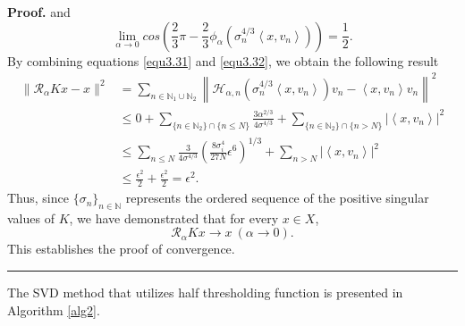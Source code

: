 \documentclass[a4paper,12pt]{article}
\numberwithin{equation}{section}
\newenvironment{proof}[1][Proof]{\textbf{#1.} }
{\ \rule{0.75em}{0.75em}\smallskip}
\begin{document}
\begin{proof}
    and
    \begin{equation*}
        \lim_{\alpha\rightarrow 0}cos\left(\frac{2}{3}\pi-\frac{2}{3}\phi_{\alpha}\left( \sigma_{n}^{4/3}\left<x,v_{n}\right>\right)\right)=\frac{1}{2}.
    \end{equation*}
    By combining equations \eqref{equ3.31} and \eqref{equ3.32}, we obtain the following result
    \begin{align*}
        \|\mathcal{R}_{\alpha}Kx-x\|^2
        & = \sum_{n\in\mathbb{N}_{1}\cup\mathbb{N}_{2}} \left\|\mathcal{H}_{\alpha,n}\left(\sigma_{n}^{4/3}\left<x,v_{n}\right>\right)v_{n}-\left<x,v_{n}\right>v_{n}\right\|^2 \nonumber\\
        & \leq 0+\sum_{\{n\in\mathbb{N}_{2}\}\cap\{n\leq N\}}\frac{3\alpha^{2/3}}{4\sigma^{4/3}}+\sum_{\{n\in\mathbb{N}_{2}\}\cap \{n> N\}}|\left<x,v_{n}\right>|^{2} \\
        & \leq \sum_{n\leq N}\frac{3}{4\sigma^{4/3}}\left(\frac{8\sigma_{i}^{4}}{27N}\epsilon^{6}\right)^{1/3}+\sum_{n> N}|\left<x,v_{n}\right>|^{2} \nonumber\\
        & \leq \frac{\epsilon^{2}}{2}+\frac{\epsilon^{2}}{2}= \epsilon^{2}.
    \end{align*}
    Thus, since $\{\sigma_{n}\}_{n\in\mathbb{N}}$ represents the ordered sequence of the positive singular values of $K$, we have demonstrated that for every $x\in X$,
    \begin{equation*}
        \mathcal{R}_{\alpha}Kx\rightarrow x\ (\alpha\rightarrow 0).
    \end{equation*}
    This establishes the proof of convergence.
\end{proof}

\par The SVD method that utilizes half thresholding function is presented in Algorithm \ref{alg2}.

\begin{algorithm}
 \caption{SVD algorithm for the $\ell^{1/2}$-SVD regularization strategy}
\begin{algorithmic}\label{alg2}
\end{algorithmic}
\end{algorithm}
\end{document}
